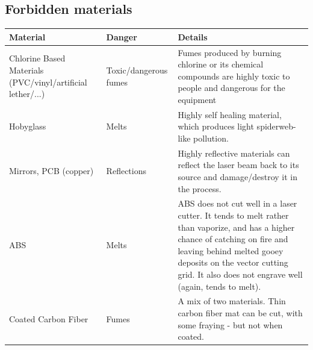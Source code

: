 \documentclass[fleqn]{article}
\begin{document}
\color{industra-manual-darkred}\subsection{Forbidden materials}
\color{black}



\renewcommand{\tabularxcolumn}[1]{m{#1}}
\begin{table}[h]
	\begin{tabularx}{\textwidth}{|m{10em}|l|X|}
		\hline\centering
		\textbf{Material} & \textbf{Danger} & \textbf{Details}                                                                                                                                                                                                                                      \\ \hline
		Chlorine Based Materials (PVC/vinyl/artificial lether/...) & Toxic/dangerous fumes & Fumes produced by burning chlorine or its chemical compounds are highly toxic to people and dangerous for the equipment                                                             \\ \hline
		Hobyglass & Melts & Highly self healing material, which produces light spiderweb-like pollution.                                                                                                                                                                    \\ \hline
		Mirrors, PCB (copper) & Reflections & Highly reflective materials can reflect the laser beam back to its source and damage/destroy it in the process.                                                                                                                                                             \\ \hline
		ABS                                                      & Melts & ABS does not cut well in a laser cutter. It tends to melt rather than vaporize, and has a higher chance of catching on fire and leaving behind melted gooey deposits on the vector cutting grid. It also does not engrave well (again, tends to melt).
		\\ \hline
		Coated Carbon Fiber  & Fumes  & A mix of two materials. Thin carbon fiber mat can be cut, with some fraying - but not when coated.                                                                                                                                                                          \\ \hline

\end{tabularx}
\end{table}
\end{document}
